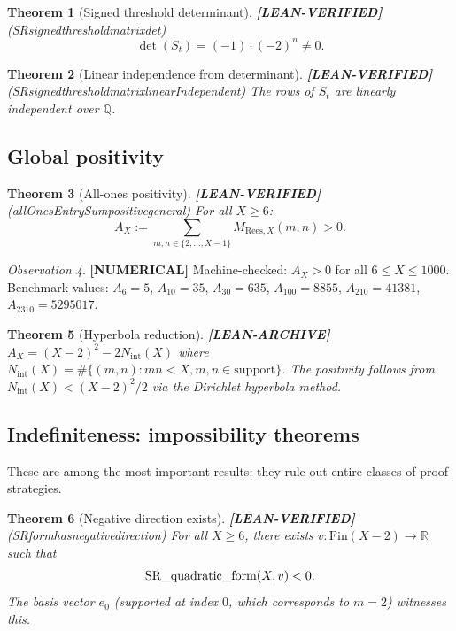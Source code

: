 \documentclass[11pt]{article}
\newtheorem{theorem}{Theorem}[section]
\theoremstyle{remark}
\newtheorem{observation}[theorem]{Observation}
\newcommand{\LEANVERIFIED}{\textbf{\color{green!60!black}[LEAN-VERIFIED]}}
\newcommand{\NUMERICAL}{\textbf{\color{orange}[NUMERICAL]}}
\newcommand{\LEANARCHIVE}{\textbf{\color{gray}[LEAN-ARCHIVE]}}
\DeclareRobustCommand{\_}{\ifmmode\text{\textunderscore}\else\textunderscore\allowbreak\fi}
\begin{document}
\begin{theorem}[Signed threshold determinant] \LEANVERIFIED{} \textnormal{(SR\_signed\_threshold\_matrix\_det)}
\[
\det(S_t) = (-1) \cdot (-2)^n \neq 0.
\]
\end{theorem}

\begin{theorem}[Linear independence from determinant] \LEANVERIFIED{} \textnormal{(SR\_signed\_threshold\_matrix\_linearIndependent)}
The rows of $S_t$ are linearly independent over $\mathbb{Q}$.
\end{theorem}

\subsection{Global positivity}

\begin{theorem}[All-ones positivity] \LEANVERIFIED{} \textnormal{(allOnesEntrySum\_positive\_general)}
For all $X \geq 6$:
\[
A_X := \sum_{m,n \in \{2,\ldots,X-1\}} M_{\mathrm{Rees},X}(m,n) > 0.
\]
\end{theorem}

\begin{observation} \NUMERICAL{}
Machine-checked: $A_X > 0$ for all $6 \leq X \leq 1000$.
Benchmark values: $A_6 = 5$, $A_{10} = 35$, $A_{30} = 635$, $A_{100} = 8855$,
$A_{210} = 41381$, $A_{2310} = 5295017$.
\end{observation}

\begin{theorem}[Hyperbola reduction] \LEANARCHIVE{}
$A_X = (X-2)^2 - 2N_{\mathrm{int}}(X)$ where $N_{\mathrm{int}}(X) = \#\{(m,n): mn < X, m,n \in \mathrm{support}\}$.
The positivity follows from $N_{\mathrm{int}}(X) < (X-2)^2/2$ via the Dirichlet hyperbola method.
\end{theorem}

\subsection{Indefiniteness: impossibility theorems}

These are among the most important results: they rule out entire classes of proof strategies.

\begin{theorem}[Negative direction exists] \LEANVERIFIED{} \textnormal{(SR\_form\_has\_negative\_direction)}
For all $X \geq 6$, there exists $v : \mathrm{Fin}(X-2) \to \mathbb{R}$ such that
\[
\operatorname{SR\_quadratic\_form}(X, v) < 0.
\]
The basis vector $e_0$ (supported at index $0$, which corresponds to $m=2$) witnesses this.
\end{theorem}
\end{document}
